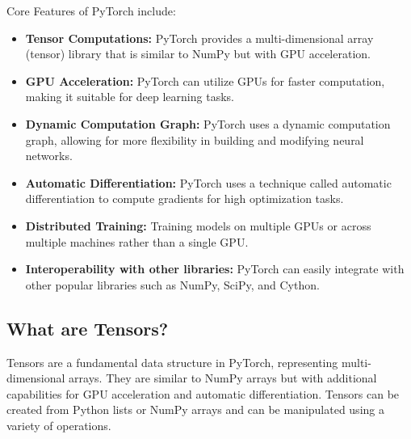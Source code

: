 \documentclass[12pt, a4paper]{article}
\begin{document}
Core Features of PyTorch include:
\begin{itemize}[nosep]
    \item \textbf{Tensor Computations:} PyTorch provides a multi-dimensional array (tensor) library that is similar to NumPy but with GPU acceleration.
    \item \textbf{GPU Acceleration:} PyTorch can utilize GPUs for faster computation, making it suitable for deep learning tasks.
    \item \textbf{Dynamic Computation Graph:} PyTorch uses a dynamic computation graph, allowing for more flexibility in building and modifying neural networks.
    \item \textbf{Automatic Differentiation:} PyTorch uses a technique called automatic differentiation to compute gradients for high optimization tasks.
    \item \textbf{Distributed Training:} Training models on multiple GPUs or across multiple machines rather than a single GPU.
    \item \textbf{Interoperability with other libraries:} PyTorch can easily integrate with other popular libraries such as NumPy, SciPy, and Cython.
\end{itemize}

\subsection{What are Tensors?}

Tensors are a fundamental data structure in PyTorch, representing multi-dimensional arrays. They are similar to NumPy arrays but with additional capabilities for GPU acceleration and automatic differentiation. Tensors can be created from Python lists or NumPy arrays and can be manipulated using a variety of operations.

\vspace{0.5em}
\end{document}
